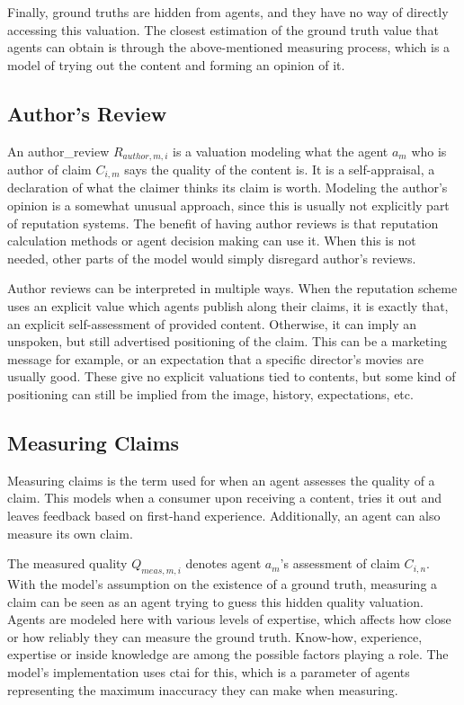 \documentclass[%
    ]{\PathToTumTemplate/thesis/tum_thesis}
\begin{document}
Finally, ground truths are hidden from agents, and they have no way of directly accessing this valuation.
The closest estimation of the ground truth value that agents can obtain is through the above-mentioned measuring process, which is a model of trying out the content and forming an opinion of it.


\subsection{Author's Review}\label{sec:approach_author_review}
An \gls{author_review} $ R_{author,m,i} $ is a valuation modeling what the agent $a_m$ who is author of claim $C_{i,m}$ says the quality of the content is.
It is a self-appraisal, a declaration of what the claimer thinks its claim is worth.
Modeling the author's opinion is a somewhat unusual approach, since this is usually not explicitly part of reputation systems.
The benefit of having author reviews is that reputation calculation methods or agent decision making can use it.
When this is not needed, other parts of the model would simply disregard author's reviews.

Author reviews can be interpreted in multiple ways.
When the reputation scheme uses an explicit value which agents publish along their claims, it is exactly that, an explicit self-assessment of provided content.
Otherwise, it can imply an unspoken, but still advertised positioning of the claim.
This can be a marketing message for example, or an expectation that a specific director's movies are usually good.
These give no explicit valuations tied to contents, but some kind of positioning can still be implied from the image, history, expectations, etc.


\subsection{Measuring Claims}\label{sec:approach_measure_claim}
Measuring claims is the term used for when an agent assesses the quality of a claim.
This models when a consumer upon receiving a content, tries it out and leaves feedback based on first-hand experience.
Additionally, an agent can also measure its own claim.

The measured quality $Q_{meas,m,i}$ denotes agent $a_m$'s assessment of claim $C_{i,n}$.
With the model's assumption on the existence of a ground truth, measuring a claim can be seen as an agent trying to guess this hidden quality valuation.
Agents are modeled here with various levels of expertise, which affects how close or how reliably they can measure the ground truth.
Know-how, experience, expertise or inside knowledge are among the possible factors playing a role.
The model's implementation uses \acrlong{ctai} for this, which is a parameter of agents representing the maximum inaccuracy they can make when measuring.
\end{document}
